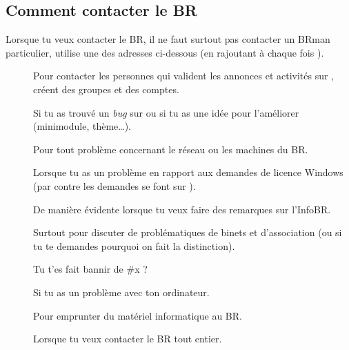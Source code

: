 \subsection{Comment contacter le BR}

Lorsque tu veux contacter le BR, il ne faut surtout pas contacter un BRman particulier, utilise une des adresses ci-dessous (en rajoutant à chaque fois ).

\begin{description}

\item[] Pour contacter les personnes qui valident les annonces et activités sur \fkz, créent des groupes et des comptes.

\item[] Si tu as trouvé un \emph{bug} sur \fkz ou si tu as une idée pour l'améliorer (minimodule, thème\dots).

\item[] Pour tout problème concernant le réseau ou les machines du BR.

\item[] Lorsque tu as un problème en rapport aux demandes de licence Windows (par contre les demandes se font sur \fkz).

\item[] De manière évidente lorsque tu veux faire des remarques sur l'InfoBR.

\item[] Surtout pour discuter de problématiques de binets et d'association (ou si tu te demandes pourquoi on fait la distinction). 

\item[] Tu t'es fait bannir de \#x ?

\item[] Si tu as un problème avec ton ordinateur.

\item[] Pour emprunter du matériel informatique au BR.

\item[] Lorsque tu veux contacter le BR tout entier.

\end{description}
